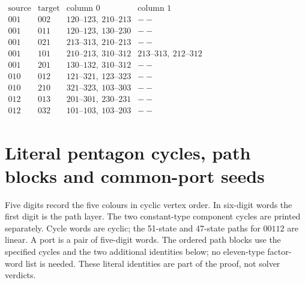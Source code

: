 \documentclass[11pt]{article}
\theoremstyle{remark}
\numberwithin{equation}{section}
\numberwithin{table}{section}
\begin{document}
\begin{table}[!htbp]
\centering\small
\renewcommand{\arraystretch}{1.15}
\caption{Two safe common edges for each representative good-boundary interface.}
\label{tab:path232-safe-edges}
$\begin{array}{c|c|l|l}
\text{source}&\text{target}&\text{column }0&\text{column }1\\\hline
001&002&120\text{--}123,\ 210\text{--}213&--\\
001&011&120\text{--}123,\ 130\text{--}230&--\\
001&021&213\text{--}313,\ 210\text{--}213&--\\
001&101&210\text{--}213,\ 310\text{--}312&213\text{--}313,\ 212\text{--}312\\
001&201&130\text{--}132,\ 310\text{--}312&--\\
010&012&121\text{--}321,\ 123\text{--}323&--\\
010&210&321\text{--}323,\ 103\text{--}303&--\\
012&013&201\text{--}301,\ 230\text{--}231&--\\
012&032&101\text{--}103,\ 103\text{--}203&--
\end{array}$
\end{table}
\clearpage
\section{Literal pentagon cycles, path blocks and common-port seeds}
\label{app:pentagon-factor-words}
Five digits record the five colours in cyclic vertex order. In six-digit
words the first digit is the path layer. The two constant-type component
cycles are printed separately. Cycle words are cyclic; the
51-state and 47-state paths for $00112$ are linear.
A port is a pair of five-digit words.
The ordered path blocks use the specified cycles and the two
additional identities below; no eleven-type factor-word list is needed.
These literal identities are part of the proof, not solver verdicts.
\end{document}
